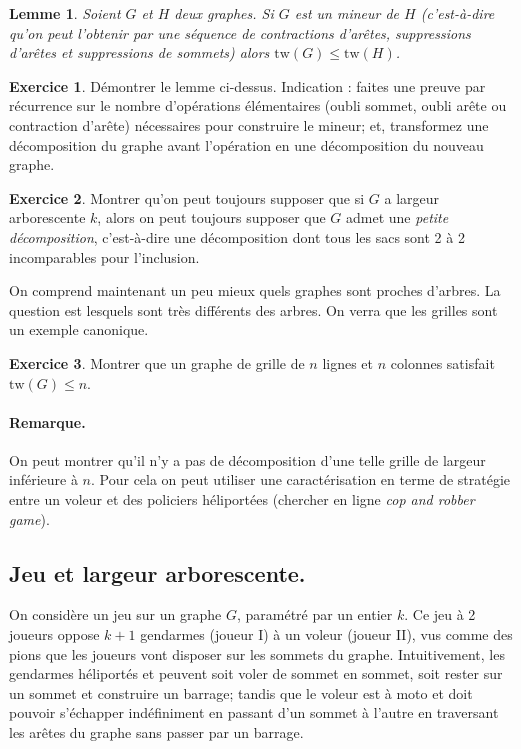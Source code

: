 \documentclass[a4paper,12pt]{article}
\newtheorem{lemma}[theorem]{Lemme}
\theoremstyle{definition}
\newtheorem{exo}{Exercice}%
\theoremstyle{remark}
\newcommand{\tw}[1]{\ensuremath{\mathrm{tw}(#1)}}
\begin{document}
\begin{lemma}
  Soient $G$ et $H$ deux graphes. Si $G$ est un mineur de $H$
  (c'est-à-dire qu'on peut l'obtenir par une séquence de contractions d'arêtes,
  suppressions d'arêtes et suppressions de sommets) alors $\tw{G} \leq \tw{H}$.
\end{lemma}

\begin{exo}
  Démontrer le lemme ci-dessus.
  Indication : faites une preuve par récurrence sur le nombre
  d'opérations élémentaires (oubli sommet, oubli arête ou contraction
  d'arête) nécessaires pour construire le mineur; et, transformez une
  décomposition du graphe avant l'opération en une décomposition du
  nouveau graphe.
\end{exo}

\begin{exo}
  Montrer qu'on peut toujours supposer que si $G$ a largeur
  arborescente $k$, alors on peut toujours supposer que $G$ admet une
  \emph{petite décomposition}, c'est-à-dire une décomposition dont
  tous les sacs sont 2 à 2 incomparables pour l'inclusion.
\end{exo}

On comprend maintenant un peu mieux quels graphes sont proches
d'arbres. La question est lesquels sont très différents des arbres. On
verra que les grilles sont un exemple canonique. 

\begin{exo}
  Montrer que un graphe de grille de $n$ lignes et $n$ colonnes
  satisfait $\tw{G}\leq n$.
\end{exo}

\paragraph{Remarque.} 
On peut montrer qu'il n'y a pas de décomposition d'une telle grille de
largeur inférieure à $n$. Pour cela on peut utiliser une
caractérisation en terme de stratégie entre un voleur et des policiers
héliportées (chercher en ligne \textsl{cop and robber game}).

\subsection*{Jeu et largeur arborescente.}
On considère un jeu sur un graphe $G$, paramétré par un entier $k$.
Ce jeu à 2 joueurs oppose $k+1$ gendarmes (joueur I) à un voleur
(joueur II), vus comme des pions que les joueurs vont disposer sur les
sommets du graphe. 
%
Intuitivement, les gendarmes héliportés et peuvent soit voler de
sommet en sommet, soit rester sur un sommet et construire un barrage;
tandis que le voleur est à moto et doit pouvoir s'échapper
indéfiniment en passant d'un sommet à l'autre en traversant les arêtes
du graphe sans passer par un barrage.
\end{document}
